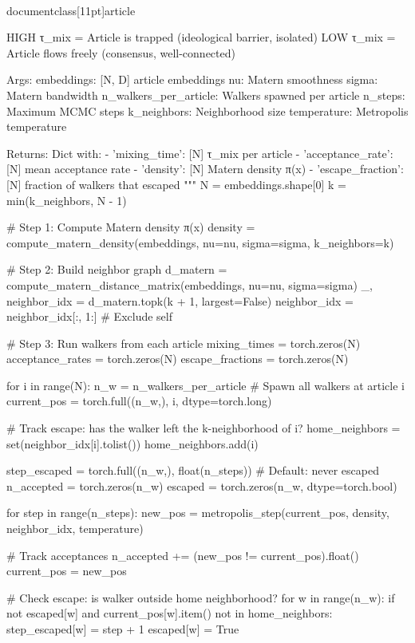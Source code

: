 \\documentclass[11pt]{article}
\begin{document}
\begin{CodeBlock}
    HIGH τ_mix = Article is trapped (ideological barrier, isolated)
    LOW  τ_mix = Article flows freely (consensus, well-connected)

    Args:
        embeddings: [N, D] article embeddings
        nu: Matern smoothness
        sigma: Matern bandwidth
        n_walkers_per_article: Walkers spawned per article
        n_steps: Maximum MCMC steps
        k_neighbors: Neighborhood size
        temperature: Metropolis temperature

    Returns:
        Dict with:
        - 'mixing_time': [N] τ_mix per article
        - 'acceptance_rate': [N] mean acceptance rate
        - 'density': [N] Matern density π(x)
        - 'escape_fraction': [N] fraction of walkers that escaped
    """
    N = embeddings.shape[0]
    k = min(k_neighbors, N - 1)

    # Step 1: Compute Matern density π(x)
    density = compute_matern_density(embeddings, nu=nu, sigma=sigma, k_neighbors=k)

    # Step 2: Build neighbor graph
    d_matern = compute_matern_distance_matrix(embeddings, nu=nu, sigma=sigma)
    _, neighbor_idx = d_matern.topk(k + 1, largest=False)
    neighbor_idx = neighbor_idx[:, 1:]  # Exclude self

    # Step 3: Run walkers from each article
    mixing_times = torch.zeros(N)
    acceptance_rates = torch.zeros(N)
    escape_fractions = torch.zeros(N)

    for i in range(N):
        n_w = n_walkers_per_article
        # Spawn all walkers at article i
        current_pos = torch.full((n_w,), i, dtype=torch.long)

        # Track escape: has the walker left the k-neighborhood of i?
        home_neighbors = set(neighbor_idx[i].tolist())
        home_neighbors.add(i)

        step_escaped = torch.full((n_w,), float(n_steps))  # Default: never escaped
        n_accepted = torch.zeros(n_w)
        escaped = torch.zeros(n_w, dtype=torch.bool)

        for step in range(n_steps):
            new_pos = metropolis_step(current_pos, density, neighbor_idx, temperature)

            # Track acceptances
            n_accepted += (new_pos != current_pos).float()
            current_pos = new_pos

            # Check escape: is walker outside home neighborhood?
            for w in range(n_w):
                if not escaped[w] and current_pos[w].item() not in home_neighbors:
                    step_escaped[w] = step + 1
                    escaped[w] = True


\end{CodeBlock}
\end{document}

